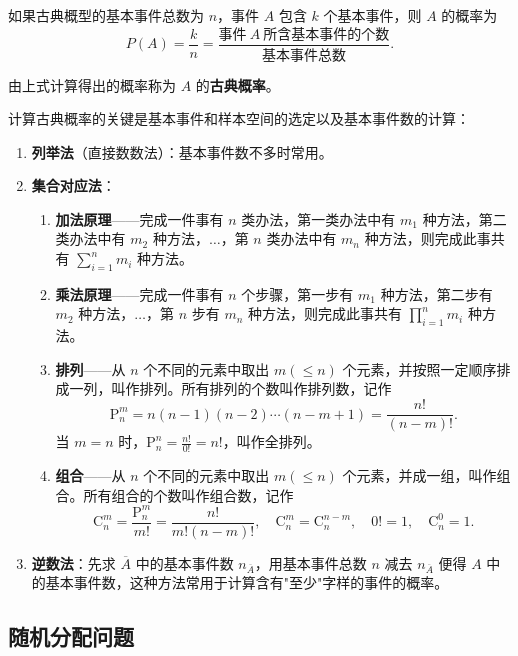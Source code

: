 ﻿\documentclass[lang=cn,11pt]{elegantbook}
\begin{document}
如果古典概型的基本事件总数为 \(n\)，事件 \(A\) 包含 \(k\) 个基本事件，则 \(A\) 的概率为
\[
P(A) = \frac{k}{n} = \frac{\text{事件} \ A \ \text{所含基本事件的个数}}{\text{基本事件总数}}.
\]

由上式计算得出的概率称为 \(A\) 的\textbf{古典概率}。

\begin{note}
计算古典概率的关键是基本事件和样本空间的选定以及基本事件数的计算：
\begin{enumerate}
    \item \textbf{列举法}（直接数数法）：基本事件数不多时常用。
    \item \textbf{集合对应法}：
    \begin{enumerate}
        \item \textbf{加法原理}——完成一件事有 \(n\) 类办法，第一类办法中有 \(m_1\) 种方法，第二类办法中有 \(m_2\) 种方法，\(\dots\)，第 \(n\) 类办法中有 \(m_n\) 种方法，则完成此事共有 \(\sum_{i=1}^{n} m_i\) 种方法。
        \item \textbf{乘法原理}——完成一件事有 \(n\) 个步骤，第一步有 \(m_1\) 种方法，第二步有 \(m_2\) 种方法，\(\dots\)，第 \(n\) 步有 \(m_n\) 种方法，则完成此事共有 \(\prod_{i=1}^{n} m_i\) 种方法。
        \item \textbf{排列}——从 \(n\) 个不同的元素中取出 \(m(\le n)\) 个元素，并按照一定顺序排成一列，叫作排列。所有排列的个数叫作排列数，记作
        \[
        \mathrm{P}_n^m = n(n-1)(n-2)\cdots(n-m+1) = \frac{n!}{(n-m)!}.
        \]
        当 \(m=n\) 时，\(\mathrm{P}_n^n = \frac{n!}{0!} = n!\)，叫作全排列。
        \item \textbf{组合}——从 \(n\) 个不同的元素中取出 \(m(\le n)\) 个元素，并成一组，叫作组合。所有组合的个数叫作组合数，记作
        \[
        \mathrm{C}_n^m = \frac{\mathrm{P}_n^m}{m!} = \frac{n!}{m!(n-m)!}, \quad \mathrm{C}_n^m = \mathrm{C}_n^{n-m}, \quad 0!=1, \quad \mathrm{C}_n^0=1.
        \]
    \end{enumerate}
    \item \textbf{逆数法}：先求 \(\overline{A}\) 中的基本事件数 \(n_{\overline{A}}\)，用基本事件总数 \(n\) 减去 \(n_{\overline{A}}\) 便得 \(A\) 中的基本事件数，这种方法常用于计算含有"至少"字样的事件的概率。
\end{enumerate}
\end{note}

\subsection*{随机分配问题}
\end{document}
